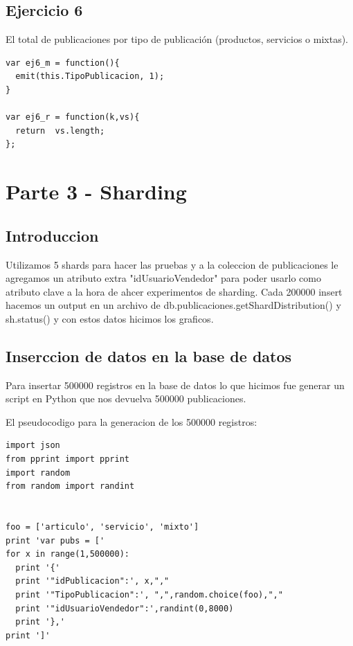 \documentclass[a4paper, 10pt, twoside]{article}
\begin{document}
\subsection{Ejercicio 6}
El total de publicaciones por tipo de publicaci\'on (productos, servicios o mixtas).

\begin{lstlisting}[caption=Ejercicio 6]
var ej6_m = function(){
  emit(this.TipoPublicacion, 1);
}

var ej6_r = function(k,vs){
  return  vs.length;
};
\end{lstlisting}
\section{Parte 3 - Sharding}
\subsection{Introduccion}

Utilizamos 5 shards para hacer las pruebas y a la coleccion de publicaciones le agregamos un atributo extra "idUsuarioVendedor" para poder usarlo como atributo clave a la hora de ahcer experimentos de sharding.
Cada 200000 insert hacemos un output en un archivo de db.publicaciones.getShardDistribution() y sh.status() y con estos datos hicimos los graficos.


\subsection{Inserccion de datos en la base de datos}
Para insertar 500000 registros en la base de datos lo que hicimos fue generar un script en Python que nos devuelva 500000 publicaciones. 

El pseudocodigo para la generacion de los 500000 registros:
\begin{verbatim}
import json
from pprint import pprint
import random
from random import randint


foo = ['articulo', 'servicio', 'mixto']
print 'var pubs = ['
for x in range(1,500000):
  print '{'
  print '"idPublicacion":', x,","
  print '"TipoPublicacion":', ",",random.choice(foo),","
  print '"idUsuarioVendedor":',randint(0,8000)
  print '},'
print ']'

\end{verbatim}
\end{document}
